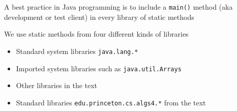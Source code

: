 \documentclass[8pt,a4paper,compress]{beamer}
\begin{document}
\begin{frame}[fragile]
\pause

A best practice in Java programming is to include a \lstinline{main()} method (aka development or test client) in every library of static methods

\pause\bigskip

We use static methods from four different kinds of libraries
\begin{itemize}
\pause
\item Standard system libraries \lstinline{java.lang.*}

\pause
\item Imported system libraries such as \lstinline{java.util.Arrays}

\pause
\item Other libraries in the text

\pause
\item Standard libraries \lstinline{edu.princeton.cs.algs4.*} from the text
\end{itemize}
\end{frame}
\end{document}
